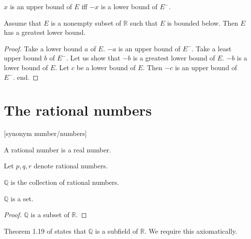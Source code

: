 \documentclass{article}
\begin{document}
\begin{forthel}
\begin{lemma}
$x$ is an upper bound of $E$ iff $-x$ is a lower bound of $E^-$.
\end{lemma}

\begin{theorem}[1 11] Assume that $E$ is a nonempty subset of $\mathbb{R}$
such that $E$ is bounded below.
Then $E$ has a greatest lower bound.\end{theorem}
\begin{proof}
Take a lower bound $a$ of $E$.
$-a$ is an upper bound of $E^-$.
Take a least upper bound $b$ of $E^-$.
Let us show that $-b$ is a greatest lower bound of $E$.
$-b$ is a lower bound of $E$. Let $c$ be a lower bound of $E$.
Then $-c$ is an upper bound of $E^-$.
end.
\end{proof}

\end{forthel}


\section{The rational numbers}

\begin{forthel}

[synonym number/numbers]

\begin{signature}[1 19a]
A rational number is a real number.
\end{signature}

Let $p,q,r$ denote rational numbers.

\begin{definition}
$\mathbb{Q}$ is the collection of rational numbers.
\end{definition}

\begin{theorem}
$\mathbb{Q}$ is a set.
\end{theorem}
\begin{proof}
$\mathbb{Q}$ is a subset of $\mathbb{R}$.
\end{proof}

\end{forthel}


Theorem 1.19 of \cite{Rudin} states that $\mathbb{Q}$ is a
subfield of $\mathbb{R}$. We require this axiomatically.
\end{document}
